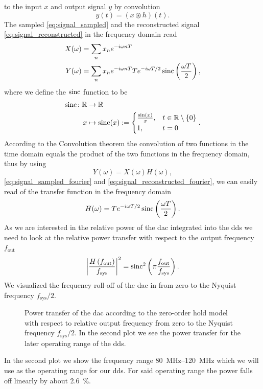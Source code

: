 to the input $x$ and output signal $y$ by convolution
\begin{equation}
  y(t)
  =
  \left(x\circledast h\right)(t).
  \label{eq:signal_transfer}
\end{equation}
The sampled \cref{eq:signal_sampled} and the reconstructed signal
\cref{eq:signal_reconstructed} in the frequency domain read
\begin{align}
  X(\omega)&=\sum_n x_n e^{-i\omega n T}
  \label{eq:signal_sampled_fourier}\\
  Y(\omega)&=\sum_n x_n e^{-i\omega n T}
  Te^{-i\omega T/2}\operatorname{sinc}\left(\frac{\omega T}{2}\right)
  \label{eq:signal_reconstructed_fourier},
\end{align}
where we define the $\operatorname{sinc}$ function to be
\begin{align}
  \operatorname{sinc}\colon\mathbb{R} &\to \mathbb{R}\\
  x &\mapsto \operatorname{sinc}(x):=
  \begin{cases}
    \frac{\sin(x)}{x}, & t\in\mathbb{R}\setminus\{0\}\\
    1, & t=0
  \end{cases}
  \label{eq:sinc}.
\end{align}
According to the Convolution theorem the convolution of two functions in the
time domain equals the product of the two functions in the frequency domain,
thus by using
\begin{equation}
  Y(\omega)
  =X(\omega)H(\omega)
  \label{eq:transfer_fourier},
\end{equation}
\cref{eq:signal_sampled_fourier} and \cref{eq:signal_reconstructed_fourier},
we can easily read of the transfer function in the frequency domain
\begin{equation}
  H(\omega)
  =Te^{-i\omega T/2}\operatorname{sinc}\left(\frac{\omega T}{2}\right).
\end{equation}
As we are interested in the relative power of the \gls{dac} integrated into
the \gls{dds} we need to look at the relative power transfer with respect to
the output frequency $f_\text{out}$
\begin{equation}
  \abs{\frac{H\left(f_\text{out}\right)}{f_\text{sys}}}^2
  =\operatorname{sinc}^2\left(\pi\frac{f_\text{out}}{f_\text{sys}}\right).
\end{equation}
We visualized the frequency roll-off of the \gls{dac} in
 from zero to the Nyquist frequency
$f_\text{sys}/2$.
\begin{figure}[htb]
  \centering
  \begin{adjustbox}{width=\textwidth}
    
  \end{adjustbox}
  \caption{Power transfer of the \gls{dac} according to the zero-order hold
    model with respect to relative output frequency from zero to the Nyquist
    frequency $f_\text{sys}/2$. In the second plot we see the power transfer
    for the later operating range of the \gls{dds}.
  }\label{fig:dds_dac_response}
\end{figure}
In the second plot we show the frequency range \SIrange{80}{120}{\mega\hertz}
which we will use as the operating range for our \gls{dds}. For said operating
range the power falls off linearly by about \SI{2.6}{\percent}.

